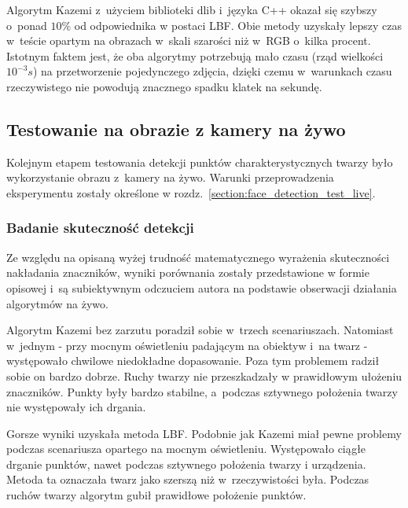 Algorytm Kazemi z~użyciem biblioteki dlib i~języka C++ okazał się szybszy o~ponad $10\%$ od odpowiednika w postaci LBF. Obie metody uzyskały lepszy czas w~teście opartym na obrazach w~skali szarości niż w~RGB o~kilka procent. Istotnym faktem jest, że oba algorytmy potrzebują mało czasu (rząd wielkości $10^{-3} s$) na przetworzenie pojedynczego zdjęcia, dzięki czemu w~warunkach czasu rzeczywistego nie powodują znacznego spadku klatek na sekundę. 


\subsection{Testowanie na obrazie z kamery na żywo}

Kolejnym etapem testowania detekcji punktów charakterystycznych twarzy było wykorzystanie obrazu z~kamery na żywo. Warunki przeprowadzenia eksperymentu zostały określone w rozdz.~\hyperref[{section:face_detection_test_live}]{\ref{section:face_detection_test_live}}.

\subsubsection{Badanie skuteczność detekcji} \label{section:facemark_live_detection}

Ze względu na opisaną wyżej trudność matematycznego wyrażenia skuteczności nakładania znaczników, wyniki porównania zostały przedstawione w formie opisowej i~są subiektywnym odczuciem autora na podstawie obserwacji działania algorytmów na żywo.

\vspace{5mm}

Algorytm Kazemi bez zarzutu poradził sobie w~trzech scenariuszach. Natomiast w~jednym - przy mocnym oświetleniu padającym na obiektyw i~na twarz - występowało chwilowe niedokładne dopasowanie. Poza tym problemem radził sobie on bardzo dobrze. Ruchy twarzy nie przeszkadzały w prawidłowym ułożeniu znaczników. Punkty były bardzo stabilne, a~podczas sztywnego położenia twarzy nie występowały ich drgania.

\par

Gorsze wyniki uzyskała metoda LBF. Podobnie jak Kazemi miał pewne problemy podczas scenariusza opartego na mocnym oświetleniu. Występowało ciągłe drganie punktów, nawet podczas sztywnego położenia twarzy i urządzenia. Metoda ta oznaczała twarz jako szerszą niż w~rzeczywistości była. Podczas ruchów twarzy algorytm gubił prawidłowe położenie punktów.

